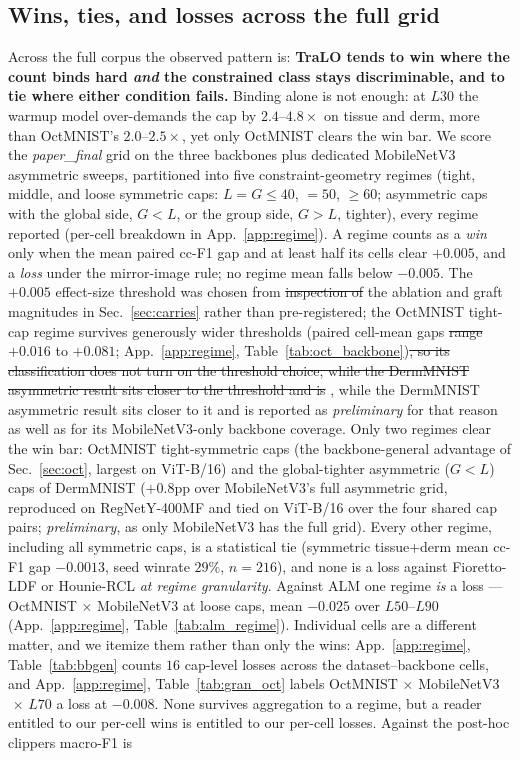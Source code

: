 \documentclass[10pt]{article}
\newcommand{\del}[1]{{\color{red}\sout{#1}}}
\begin{document}
\subsection{Wins, ties, and losses across the full grid}
\label{sec:regime}

Across the full corpus the observed pattern is: \textbf{TraLO tends to win
where the count binds hard \emph{and} the constrained class stays
discriminable, and to tie where either condition fails.} Binding alone is not enough: at
$L30$ the warmup model over-demands the cap by $2.4$--$4.8\times$ on tissue
and derm, more than OctMNIST's $2.0$--$2.5\times$, yet only OctMNIST clears
the win bar. We score the \emph{paper\_final} grid on the three backbones
plus dedicated MobileNetV3 asymmetric sweeps, partitioned into five
constraint-geometry regimes (tight, middle, and loose symmetric caps:
$L{=}G{\le}40$, ${=}50$, ${\ge}60$; asymmetric caps with the global side,
$G{<}L$, or the group side, $G{>}L$, tighter), every regime reported
(per-cell breakdown in App.~\ref{app:regime}). A regime counts as a
\emph{win} only when the mean paired cc-F1 gap and at least half its
cells clear $+0.005$, and a \emph{loss} under the mirror-image rule; no
regime mean falls below $-0.005$. The $+0.005$ effect-size threshold
was chosen from \del{inspection of }the ablation and graft magnitudes in
Sec.~\ref{sec:carries} rather than pre-registered; the OctMNIST
tight-cap regime survives generously wider thresholds (paired cell-mean
gaps \del{range }$+0.016$ to $+0.081$; {\color{blue}App.~\ref{app:regime}, }Table~\ref{tab:oct_backbone})\del{, so its
classification does not turn on the threshold choice, while the
DermMNIST asymmetric result sits closer to the threshold and is}%
{\color{blue}, while the DermMNIST asymmetric result sits closer to it and is}
reported as \emph{preliminary} for that reason as well as for its
MobileNetV3-only backbone coverage. Only two regimes clear the win bar:
OctMNIST tight-symmetric caps (the backbone-general advantage of
Sec.~\ref{sec:oct}, largest on ViT-B/16) and the global-tighter
asymmetric ($G{<}L$) caps of DermMNIST ($+0.8$pp over MobileNetV3's full
asymmetric grid, reproduced on RegNet{\color{blue}Y-400MF} and tied on ViT{\color{blue}-B/16} over the four shared
cap pairs; \emph{preliminary}, as only MobileNetV3 has the full grid).
Every other regime, including all symmetric caps, is a statistical tie
(symmetric tissue+derm mean cc-F1 gap $-0.0013$, seed winrate $29\%$,
$n{=}216$), and none is a loss{\color{blue} against Fioretto-LDF or Hounie-RCL
\emph{at regime granularity}. Against ALM one regime \emph{is} a loss --- OctMNIST
$\times$ MobileNetV3 at loose caps, mean $-0.025$ over $L50$--$L90$
({\color{blue}App.~\ref{app:regime}, }Table~\ref{tab:alm_regime}).
Individual cells are a different matter, and we itemize them rather than only
the wins: {\color{blue}App.~\ref{app:regime}, }Table~\ref{tab:bbgen} counts $16$ cap-level losses across the
dataset--backbone cells, and {\color{blue}App.~\ref{app:regime}, }Table~\ref{tab:gran_oct} labels
OctMNIST$\,\times\,$MobileNetV3$\,\times\,L70$ a loss at $-0.008$. None survives
aggregation to a regime, but a reader entitled to our per-cell wins is entitled
to our per-cell losses}. Against the post-hoc clippers macro-F1 is
\end{document}
